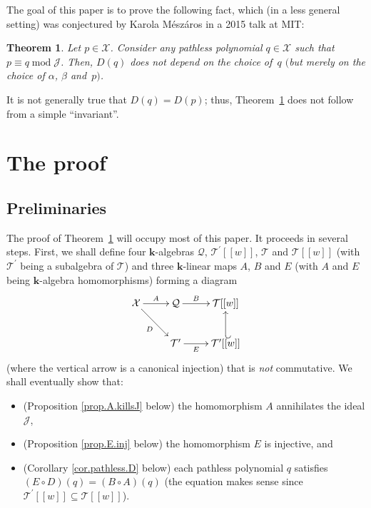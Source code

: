 \documentclass[11pt]{article}
\makeatletter
\newtheorem{Theorem}{Theorem}[section]
\numberwithin{equation}{section}
\newcommand{\calX}{\mathcal{X}}
\newcommand{\calQ}{\mathcal{Q}}
\newcommand{\calT}{\mathcal{T}}
\newcommand{\arinj}{\ar@{_{(}->}}
\makeatother
\begin{document}
The goal of this paper is to prove the following fact, which (in a less general setting) was conjectured by Karola M\'{e}sz\'{a}ros in a 2015 talk at MIT:

\begin{Theorem}\label{thm.t-red.unique}Let $p\in\mathcal{X}$. Consider any pathless polynomial $q\in\mathcal{X}$ such that $p\equiv q\operatorname{mod} \mathcal{J}$. Then, $D(q) $ does not depend on the choice of~$q$ $($but merely on the choice of $\alpha$, $\beta$ and~$p)$.
\end{Theorem}

It is not generally true that $D(q) =D(p) $; thus, Theorem~\ref{thm.t-red.unique} does not follow from a simple ``invariant''.

\section{The proof}\label{sect.proof}

\subsection{Preliminaries}

The proof of Theorem~\ref{thm.t-red.unique} will occupy most of this paper. It proceeds in several steps. First, we shall define four $\mathbf{k}$-algebras $\mathcal{Q}$, $\mathcal{T}^{\prime} [ [w] ] $, $\mathcal{T}$ and $\mathcal{T}[[w]] $ (with $\mathcal{T}^{\prime}$ being a subalgebra of $\mathcal{T}$) and three $\mathbf{k}$-linear maps $A$, $B$ and $E$ (with $A$ and $E$ being $\mathbf{k}$-algebra homomorphisms) forming a diagram
\begin{gather*}
\xymatrix{\calX\ar[r]^{A} \ar[dr]_{D} & \calQ\ar[r]^-{B} & \calT [ [w]] \\
& \calT^\prime\ar[r]_-{E} & \calT^\prime[[w]] \arinj[u]
}
\end{gather*}
(where the vertical arrow is a canonical injection) that is \textit{not} commutative. We shall eventually show that:
\begin{itemize}\itemsep=0pt
\item (Proposition \ref{prop.A.killsJ} below) the homomorphism $A$ annihilates the ideal $\mathcal{J}$,

\item (Proposition \ref{prop.E.inj} below) the homomorphism $E$ is injective, and

\item (Corollary \ref{cor.pathless.D} below) each pathless polynomial $q$ satisfies $( E\circ D) (q) =( B\circ A ) (q) $ (the equation makes sense since $\mathcal{T}^{\prime}[[w]] \subseteq\mathcal{T}[[w]]$).
\end{itemize}
\end{document}
